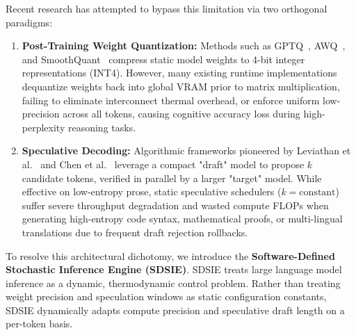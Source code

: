 \documentclass[10pt,journal,compsoc,twocolumn]{IEEEtran}
\begin{document}
Recent research has attempted to bypass this limitation via two orthogonal paradigms:
\begin{enumerate}
    \item \textbf{Post-Training Weight Quantization:} Methods such as GPTQ~\cite{frantar2022gptq}, AWQ~\cite{lin2023awq}, and SmoothQuant~\cite{xiao2023smoothquant} compress static model weights to 4-bit integer representations (INT4). However, many existing runtime implementations dequantize weights back into global VRAM prior to matrix multiplication, failing to eliminate interconnect thermal overhead, or enforce uniform low-precision across all tokens, causing cognitive accuracy loss during high-perplexity reasoning tasks.
    \item \textbf{Speculative Decoding:} Algorithmic frameworks pioneered by Leviathan et al.~\cite{leviathan2023fast} and Chen et al.~\cite{chen2023speculative} leverage a compact "draft" model to propose $k$ candidate tokens, verified in parallel by a larger "target" model. While effective on low-entropy prose, static speculative schedulers ($k=\text{constant}$) suffer severe throughput degradation and wasted compute FLOPs when generating high-entropy code syntax, mathematical proofs, or multi-lingual translations due to frequent draft rejection rollbacks.
\end{enumerate}

To resolve this architectural dichotomy, we introduce the \textbf{Software-Defined Stochastic Inference Engine (SDSIE)}. SDSIE treats large language model inference as a dynamic, thermodynamic control problem. Rather than treating weight precision and speculation windows as static configuration constants, SDSIE dynamically adapts compute precision and speculative draft length on a per-token basis.
\end{document}
